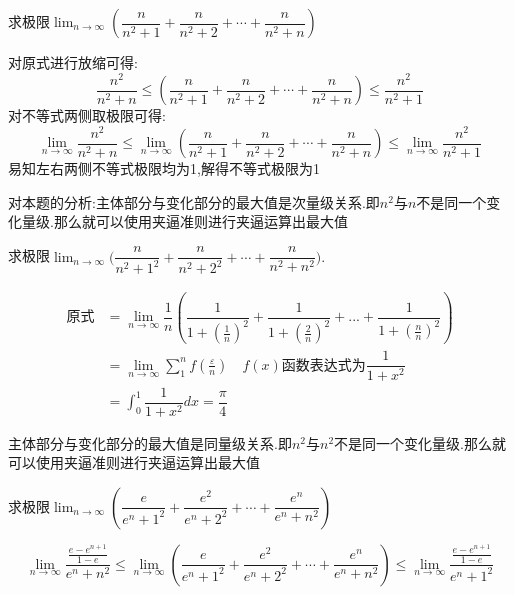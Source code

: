 \documentclass[8pt a4paper, oneside, UTF8]{ctexbook}
\begin{document}
\begin{sloppypar}
\begin{enumerate}
    \end{enumerate}
     \begin{problem}
        求极限$\lim_{n\to\infty}\left(\dfrac n{n^2+1}+\dfrac n{n^2+2}+\cdots+\dfrac n{n^2+n}\right)$
    \end{problem}
    \begin{solution}
        对原式进行放缩可得:
        $$
            \dfrac{n^2}{n^2+n} \leqslant \left(\dfrac n{n^2+1}+\dfrac n{n^2+2}+\cdots+\dfrac n{n^2+n}\right) \leqslant \dfrac{n^2}{n^2+1}
        $$
        对不等式两侧取极限可得:
        $$
            \lim_{n \to \infty} \dfrac{n^2}{n^2+n} \leqslant \lim_{n \to \infty} \left(\dfrac n{n^2+1}+\dfrac n{n^2+2}+\cdots+\dfrac n{n^2+n}\right) \leqslant \lim_{n \to \infty} \dfrac{n^2}{n^2+1}
        $$
        易知左右两侧不等式极限均为1,解得不等式极限为1
    \end{solution}
    \begin{note}
        对本题的分析:主体部分与变化部分的最大值是次量级关系.即$n^2$与$n$不是同一个变化量级.那么就可以使用夹逼准则进行夹逼运算出最大值
    \end{note}
    \begin{problem}
        求极限$\lim_{n\to\infty}\Big(\dfrac n{n^2+1^2}+\dfrac n{n^2+2^2}+\cdots+\dfrac n{n^2+n^2}\Big).$    
    \end{problem}
    \begin{solution}
        \begin{align*}
          \text{原式} & = \lim_{n \to \infty}\dfrac{1}{n}(\dfrac{1}{1+(\frac{1}{n})^2}+\dfrac{1}{1+(\frac{2}{n})^2}+...+\dfrac{1}{1+(\frac{n}{n})^2})\\
          & = \lim_{n \to \infty} \sum_{1}^{n}f(\frac{\varepsilon}{n}) \quad f(x)\text{函数表达式为}\dfrac{1}{1+x^2}\\
          & = \int_0 ^1 \dfrac{1}{1+x^2} dx =\dfrac{\pi}{4}
        \end{align*}
    \end{solution}
    \begin{note}
        主体部分与变化部分的最大值是同量级关系.即$n^2$与$n^2$不是同一个变化量级.那么就可以使用夹逼准则进行夹逼运算出最大值
    \end{note}
    \begin{problem}
        求极限$\lim_{n\to\infty}\left(\dfrac{e}{e^{n}+1^{2}}+\dfrac{e^{2}}{e^{n}+2^{2}}+\cdots+\dfrac{e^{n}}{e^{n}+n^{2}}\right)$
    \end{problem}
    \begin{solution}
        $$\lim_{n \to \infty} \dfrac{\frac{e-e^{n+1}}{1-e}}{e^n+n^2} \leqslant \lim_{n\to\infty}\left(\dfrac{e}{e^{n}+1^{2}}+\dfrac{e^{2}}{e^{n}+2^{2}}+\cdots+\dfrac{e^{n}}{e^{n}+n^{2}}\right) \leqslant \lim_{n \to \infty} \dfrac{\frac{e-e^{n+1}}{1-e}}{e^n+1^2}$$

\end{solution}
\end{sloppypar}
\end{document}
